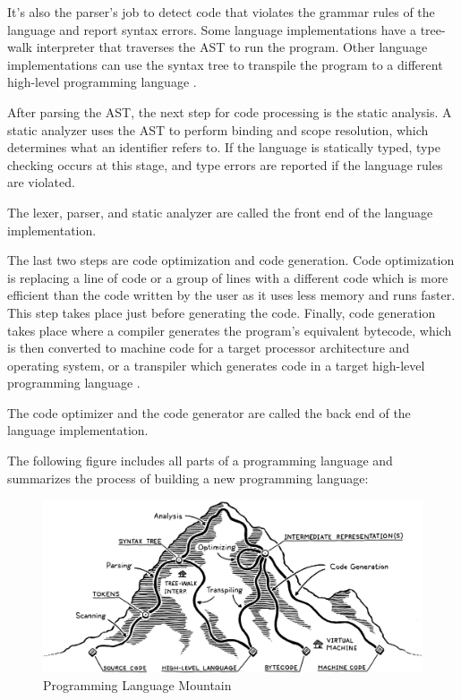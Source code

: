 It’s also the parser's job to detect code that violates the grammar rules of the language and report syntax errors.
Some language implementations have a tree-walk interpreter that traverses the AST to run the program. Other language implementations can use the syntax tree to transpile the program to a different high-level programming language \cite{nystrom2021crafting}.

After parsing the AST, the next step for code processing is the static analysis. A static analyzer uses the AST to perform binding and scope resolution, which determines what an identifier refers to. If the language is statically typed, type checking occurs at this stage, and type errors are reported if the language rules are violated.

The lexer, parser, and static analyzer are called the front end of the language implementation.

The last two steps are code optimization and code generation. Code optimization is replacing a line of code or a group of lines with a different code which is more efficient than the code written by the user as it uses less memory and runs faster. This step takes place just before generating the code. Finally, code generation takes place where a compiler generates the program's equivalent bytecode, which is then converted to machine code for a target processor architecture and operating system, or a transpiler which generates code in a target high-level programming language \cite{nystrom2021crafting}.

The code optimizer and the code generator are called the back end of the language implementation.

The following figure includes all parts of a programming language and summarizes the process of building a new programming language:
\begin{figure}[ht]
\centering
\includegraphics[width=15cm]{ch2-images/mountain.png}
\caption{Programming Language Mountain \cite{nystrom2021crafting}}
\label{fig:Programming Language Mountain}
\end{figure}

